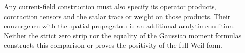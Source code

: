 Any current-field construction must also specify its operator products,
contraction tensors and the scalar trace or weight on those products.
Their convergence with the spatial propagators is an additional analytic
condition.  Neither the strict zero strip nor the equality of the
Gaussian moment formulas constructs this comparison or proves the
positivity of the full Weil form.

\clearpage
\endgroup
